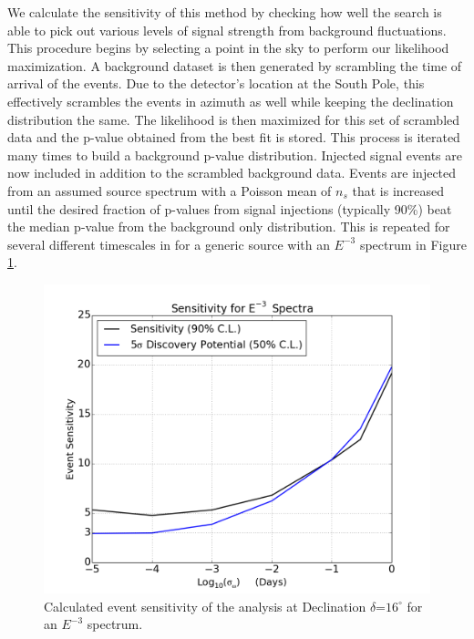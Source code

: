 \documentclass{gatech-thesis}
\begin{document}
We calculate the sensitivity of this method by checking how well the search is able to pick out various levels of signal strength from background fluctuations. This procedure begins by selecting a point in the sky to perform our likelihood maximization. A background dataset is then generated by scrambling the time of arrival of the events. Due to the detector's location at the South Pole, this effectively scrambles the events in azimuth as well while keeping the declination distribution the same. The likelihood is then maximized for this set of scrambled data and the p-value obtained from the best fit is stored. This process is iterated many times to build a background p-value distribution. Injected signal events are now included in addition to the scrambled background data. Events are injected from an assumed source spectrum with a Poisson mean of $n_s$ that is increased until the desired fraction of p-values from signal injections (typically 90\%) beat the median p-value from the background only distribution. This is repeated for several different timescales in for a generic source with an $E^{-3}$ spectrum in Figure \ref{fig:SensE3}.
\begin{figure}[ht]
  \begin{center}
    \includegraphics[width=.8\textwidth,keepaspectratio]{LowEnTransient_NEventDiscoveryPotentialANDSensitivity_E3.png}
  \end{center}
  \caption{Calculated event sensitivity of the analysis at Declination $\delta$=$16^{\circ}$ for an $E^{-3}$ spectrum.}
  \label{fig:SensE3}
\end{figure}
\end{document}
